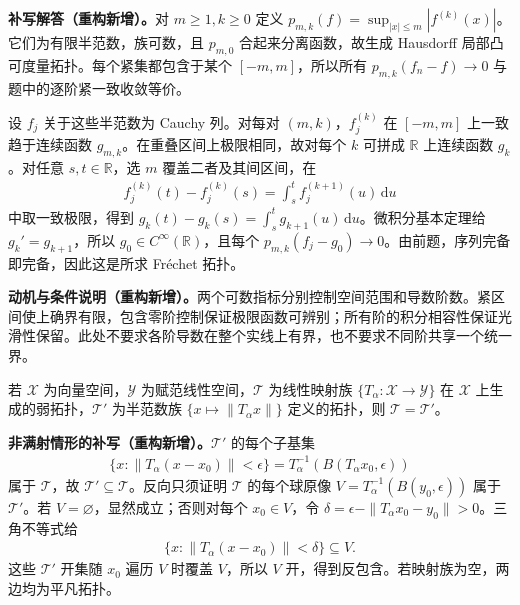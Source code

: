 \documentclass[../../main.tex]{subfiles}
\begin{document}
\begin{solution}
\textbf{补写解答（重构新增）。}对 $m\ge1,k\ge0$ 定义 $p_{m,k}(f)=\sup_{|x|\le m}|f^{(k)}(x)|$。它们为有限半范数，族可数，且 $p_{m,0}$ 合起来分离函数，故生成 Hausdorff 局部凸可度量拓扑。每个紧集都包含于某个 $[-m,m]$，所以所有 $p_{m,k}(f_n-f)\to0$ 与题中的逐阶紧一致收敛等价。

设 $f_j$ 关于这些半范数为 Cauchy 列。对每对 $(m,k)$，$f_j^{(k)}$ 在 $[-m,m]$ 上一致趋于连续函数 $g_{m,k}$。在重叠区间上极限相同，故对每个 $k$ 可拼成 $\mathbb R$ 上连续函数 $g_k$。对任意 $s,t\in\mathbb R$，选 $m$ 覆盖二者及其间区间，在
\begin{align*}
f_j^{(k)}(t)-f_j^{(k)}(s)=\int_s^t f_j^{(k+1)}(u)\,\mathrm du
\end{align*}
中取一致极限，得到 $g_k(t)-g_k(s)=\int_s^t g_{k+1}(u)\,\mathrm du$。微积分基本定理给 $g_k'=g_{k+1}$，所以 $g_0\in C^\infty(\mathbb R)$，且每个 $p_{m,k}(f_j-g_0)\to0$。由前题，序列完备即完备，因此这是所求 Fr\'echet 拓扑。
\end{solution}
\begin{remark}
\textbf{动机与条件说明（重构新增）。}两个可数指标分别控制空间范围和导数阶数。紧区间使上确界有限，包含零阶控制保证极限函数可辨别；所有阶的积分相容性保证光滑性保留。此处不要求各阶导数在整个实线上有界，也不要求不同阶共享一个统一界。
\end{remark}
\begin{exercise}\label{exercise:ch05-initial-seminorm-topology}
若 $\mathcal X$ 为向量空间，$\mathcal Y$ 为赋范线性空间，$\mathcal T$ 为线性映射族 $\{T_\alpha:\mathcal X\to\mathcal Y\}$ 在 $\mathcal X$ 上生成的弱拓扑，$\mathcal T'$ 为半范数族 $\{x\mapsto\|T_\alpha x\|\}$ 定义的拓扑，则 $\mathcal T=\mathcal T'$。
\end{exercise}
\begin{solution}
\textbf{非满射情形的补写（重构新增）。}$\mathcal T'$ 的每个子基集
\begin{align*}
\{x:\|T_\alpha(x-x_0)\|<\epsilon\}=T_\alpha^{-1}(B(T_\alpha x_0,\epsilon))
\end{align*}
属于 $\mathcal T$，故 $\mathcal T'\subseteq\mathcal T$。反向只须证明 $\mathcal T$ 的每个球原像 $V=T_\alpha^{-1}(B(y_0,\epsilon))$ 属于 $\mathcal T'$。若 $V=\varnothing$，显然成立；否则对每个 $x_0\in V$，令 $\delta=\epsilon-\|T_\alpha x_0-y_0\|>0$。三角不等式给
\begin{align*}
\{x:\|T_\alpha(x-x_0)\|<\delta\}\subseteq V.
\end{align*}
这些 $\mathcal T'$ 开集随 $x_0$ 遍历 $V$ 时覆盖 $V$，所以 $V$ 开，得到反包含。若映射族为空，两边均为平凡拓扑。
\end{solution}
\end{document}
